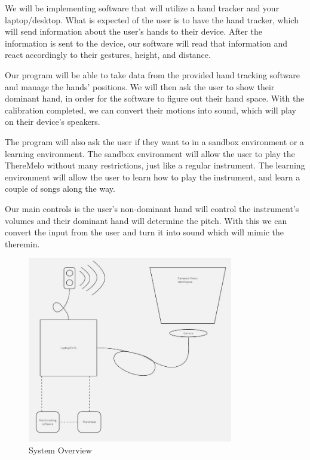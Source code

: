 
We will be implementing software that will utilize a hand tracker and your laptop/desktop. What is expected of the user is to have the hand tracker, which will send information about the user's hands to their device. After the information is sent to the device, our software will read that information and react accordingly to their gestures, height, and distance.

Our program will be able to take data from the provided hand tracking software and manage the hands' positions. We will then ask the user to show their dominant hand, in order for the software to figure out their hand space. With the calibration completed, we can convert their motions into sound, which will play on their device's speakers.

The program will also ask the user if they want to in a sandbox environment or a learning environment. The sandbox environment will allow the user to play the ThereMelo without many restrictions, just like a regular instrument. The learning environment will allow the user to learn how to play the instrument, and learn a couple of songs along the way.

Our main controls is the user's non-dominant hand will control the instrument's volumes and their dominant hand will determine the pitch. With this we can convert the input from the user and turn it into sound which will mimic the theremin. 

\begin{figure}[h!]
	\centering
   	\includegraphics[width=0.8\textwidth]{images/systemOverview.jpg}
    \caption{System Overview}
\end{figure}
